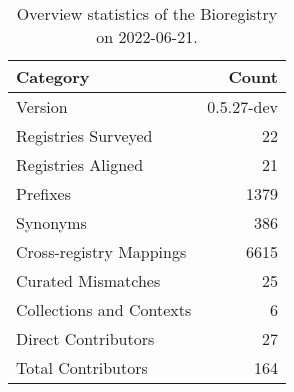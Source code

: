 \begin{table}
\centering
\caption{Overview statistics of the Bioregistry on 2022-06-21.}
\label{tab:bioregistry-summary}
\begin{tabular}{lr}
\toprule
                Category &      Count \\
\midrule
                 Version & 0.5.27-dev \\
     Registries Surveyed &         22 \\
      Registries Aligned &         21 \\
                Prefixes &       1379 \\
                Synonyms &        386 \\
 Cross-registry Mappings &       6615 \\
      Curated Mismatches &         25 \\
Collections and Contexts &          6 \\
     Direct Contributors &         27 \\
      Total Contributors &        164 \\
\bottomrule
\end{tabular}
\end{table}
